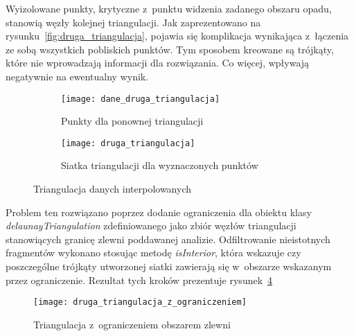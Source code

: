 Wyizolowane punkty, krytyczne z~punktu widzenia zadanego obszaru opadu, stanowią węzły kolejnej triangulacji. Jak zaprezentowano na rysunku~\ref{fig:druga_triangulacja}, pojawia się komplikacja wynikająca z~łączenia ze sobą wszystkich pobliskich punktów. Tym sposobem kreowane są trójkąty, które nie wprowadzają informacji dla rozwiązania. Co więcej, wpływają negatywnie na ewentualny wynik.

\begin{figure}[ht]
	\centering
\begin{subfigure}[t]{1\textwidth}
	\centering
	\texttt{[image: dane\_druga\_triangulacja]}
	\caption{Punkty dla ponownej triangulacji}
	\label{fig:dane_druga_triangulacja}
\end{subfigure}	
	\begin{subfigure}[t]{1\textwidth}
	\centering
	\texttt{[image: druga\_triangulacja]}
	\caption{Siatka triangulacji dla wyznaczonych punktów}
	\label{fig:druga_triagnulacja}
\end{subfigure}	
\caption{Triangulacja danych interpolowanych}
\end{figure}

Problem ten rozwiązano poprzez dodanie ograniczenia dla obiektu klasy \textit{delaunayTriangulation} zdefiniowanego jako zbiór węzłów triangulacji stanowiących granicę zlewni poddawanej analizie. Odfiltrowanie nieistotnych fragmentów wykonano stosując metodę \textit{isInterior}, która wskazuje czy poszczególne trójkąty utworzonej siatki zawierają się w~obszarze wskazanym przez ograniczenie. Rezultat tych kroków prezentuje rysunek~\ref{fig:druga_triangulacja_ograniczenie}

\begin{figure}[ht]
	\centering
	\texttt{[image: druga\_triangulacja\_z\_ograniczeniem]}
	\caption{Triangulacja z~ograniczeniem obszarem zlewni}
	\label{fig:druga_triangulacja_ograniczenie}
\end{figure}